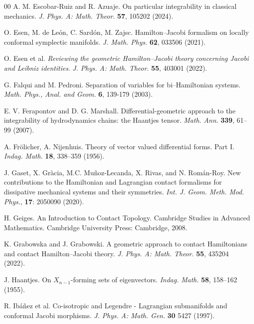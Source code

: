 \documentclass[10pt]{amsart}
\numberwithin{equation}{section}
\newcommand{\tbf}{\textbf}
\theoremstyle{definition}
\begin{document}
\begin{thebibliography}{00}
 A. M. Escobar-Ruiz and R. Azuaje. On particular integrability in classical mechanics. \textit{J. Phys. A: Math. Theor.} \textbf{57}, 105202 (2024).

 O. Esen, M. de Le\'on, C. Sard\'on, M. Zajsc. Hamilton--Jacobi formalism on locally conformal symplectic manifolds. \textit{J. Math. Phys.} \tbf{62},  033506 (2021).

 O. Esen et al. \textit{Reviewing the geometric Hamilton–Jacobi theory concerning Jacobi and Leibniz identities}. \textit{J. Phys. A: Math. Theor.} \tbf{55}, 403001 (2022).

 G. Falqui and M. Pedroni. Separation of variables for bi--Hamiltonian systems. \textit{Math. Phys., Anal. and Geom.} \textbf{6}, 139-179 (2003).


 E. V. Ferapontov and D. G. Marshall. Differential-geometric approach to the integrability of hydrodynamics chains: the Haantjes tensor. \textit{Math. Ann.} \textbf{339}, 61--99 (2007).

 A. Fr\"olicher, A. Nijenhuis. Theory of vector valued differential forms. Part I. \textit{Indag. Math.} \textbf{18},  338--359 (1956).

 J. Gaset, X. Gr\`acia, M.C. Mu\~{n}oz-Lecanda, X. Rivas, and N. Rom\'an-Roy. New contributions to the Hamiltonian and Lagrangian contact formalisms for dissipative mechanical systems and their symmetries. \textit{Int. J. Geom. Meth. Mod. Phys.}, \tbf{17}: 2050090 (2020).

 H. Geiges. An Introduction to Contact Topology. Cambridge Studies in Advanced Mathematics. Cambridge University Press: Cambridge, 2008. 

 K. Grabowska and J. Grabowski. A geometric approach to contact {H}amiltonians and contact {H}amilton–{J}acobi theory. \textit{J. Phys. A: Math. Theor.} \tbf{55}, 435204 (2022).

 J. Haantjes. On $X_{n-1}$-forming sets of eigenvectors. \textit{Indag. Math.} \textbf{58}, 158--162 (1955).

 R. Ibáñez et al. Co-isotropic and Legendre - Lagrangian submanifolds and conformal Jacobi morphisms. \textit{J. Phys. A: Math. Gen.} \textbf{30} 5427 (1997).


\end{thebibliography}
\end{document}

